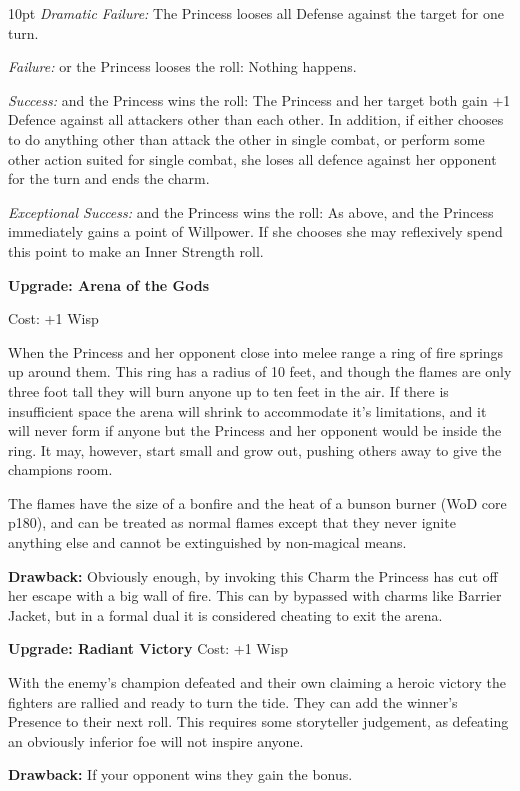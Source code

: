 \begin{myindentpar}{10pt} 
\emph{Dramatic Failure:} The Princess looses all Defense against the target for one turn.

\emph{Failure:} or the Princess looses the roll: Nothing happens.

\emph{Success:} and the Princess wins the roll: The Princess and her target both gain +1 Defence against all attackers other than each other. In addition, if either chooses to do anything other than attack the other in single combat, or perform some other action suited for single combat, she loses all defence against her opponent for the turn and ends the charm.

\emph{Exceptional Success:} and the Princess wins the roll: As above, and the Princess immediately gains a point of Willpower. If she chooses she may reflexively spend this point to make an Inner Strength roll.

\textbf{Upgrade: Arena of the Gods}

Cost: +1 Wisp

When the Princess and her opponent close into melee range a ring of fire springs up around them. This ring has a radius of 10 feet, and though the flames are only three foot tall they will burn anyone up to ten feet in the air. If there is insufficient space the arena will shrink to accommodate it's limitations, and it will never form if anyone but the Princess and her opponent would be inside the ring. It may, however, start small and grow out, pushing others away to give the champions room.

The flames have the size of a bonfire and the heat of a bunson burner (WoD core p180), and can be treated as normal flames except that they never ignite anything else and cannot be extinguished by non-magical means.

\textbf{Drawback:} Obviously enough, by invoking this Charm the Princess has cut off her escape with a big wall of fire. This can by bypassed with charms like Barrier Jacket, but in a formal dual it is considered cheating to exit the arena.

\textbf{Upgrade: Radiant Victory}
Cost: +1 Wisp

With the enemy's champion defeated and their own claiming a heroic victory the fighters are rallied and ready to turn the tide. They can add the winner's Presence to their next roll. This requires some storyteller judgement, as defeating an obviously inferior foe will not inspire anyone. 

\textbf{Drawback:} If your opponent wins they gain the bonus.\end{myindentpar}

